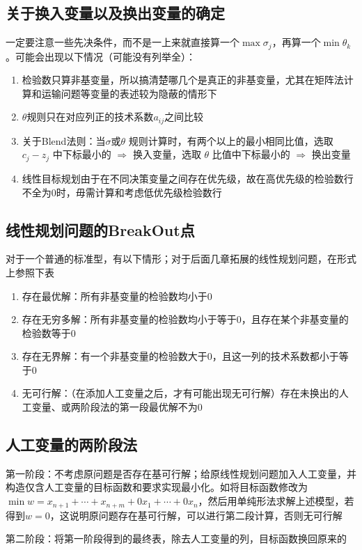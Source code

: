 \documentclass[]{report}
\begin{document}
		\subsection{关于换入变量以及换出变量的确定}
		一定要注意一些先决条件，而不是一上来就直接算一个$\max\sigma_j$，再算一个$\min\theta_k$。可能会出现以下情况（可能没有列举全）：\par
		\begin{enumerate}
			\item 检验数只算非基变量，所以搞清楚哪几个是真正的非基变量，尤其在矩阵法计算和运输问题等变量的表述较为隐蔽的情形下
			\item $\theta$规则只在对应列正的技术系数$a_{ij}$之间比较
			\item 关于Blend法则：当$\sigma$或$\theta$ 规则计算时，有两个以上的最小相同比值，选取 $c_j-z_j$ 中下标最小的 $\Rightarrow$ 换入变量，选取 $\theta$ 比值中下标最小的 $\Rightarrow$ 换出变量
			\item 线性目标规划由于在不同决策变量之间存在优先级，故在高优先级的检验数行不全为0时，毋需计算和考虑低优先级检验数行
		\end{enumerate}

		\subsection{线性规划问题的BreakOut点}
		对于一个普通的标准型，有以下情形；对于后面几章拓展的线性规划问题，在形式上参照下表
		\begin{enumerate}
			\item 存在最优解：所有非基变量的检验数均小于0
			\item 存在无穷多解：所有非基变量的检验数均小于等于0，且存在某个非基变量的检验数等于0
			\item 存在无界解：有一个非基变量的检验数大于0，且这一列的技术系数都小于等于0
			\item 无可行解：（在添加人工变量之后，才有可能出现无可行解）存在未换出的人工变量、或两阶段法的第一段最优解不为0
		\end{enumerate}
		\subsection{人工变量的两阶段法}
		第一阶段：不考虑原问题是否存在基可行解；给原线性规划问题加入人工变量，并构造仅含人工变量的目标函数和要求实现最小化。如将目标函数修改为 $\min w=x_{n+1}+\cdots+x_{n+m}+0x_1+\cdots+0x_n$，然后用单纯形法求解上述模型，若得到$w=0$，这说明原问题存在基可行解，可以进行第二段计算，否则无可行解\par
		第二阶段：将第一阶段得到的最终表，除去人工变量的列，目标函数换回原来的
\end{document}
